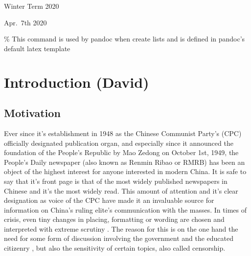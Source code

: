 \documentclass[12pt,a4paper]{article}
\begin{document}
\begin{titlepage}
  \noindent\begin{minipage}[t]{0.5\textwidth}
  \end{minipage}
  \begin{minipage}[t]{0.7\textwidth}
  \hspace{1cm}Winter Term 2020
  \end{minipage}

  \noindent\begin{minipage}[t]{0.5\textwidth}
  \end{minipage}
  \begin{minipage}[t]{0.7\textwidth}
  \hspace{1cm}Apr.~7th 2020
  \end{minipage}

\end{titlepage}

\restoregeometry


{
\hypersetup{linkcolor=black}
\setcounter{tocdepth}{2}
\tableofcontents
}
\newpage
\listoftables
\newpage
\listoffigures
\newpage
{} 
\% This command is used by pandoc when create lists and is defined in pandoc's default latex template
\providecommand{\tightlist}{%
  \setlength{\itemsep}{0pt}\setlength{\parskip}{0pt}}

\hypertarget{introduction-david}{%
\section{Introduction (David)}\label{introduction-david}}

\hypertarget{motivation}{%
\subsection{Motivation}\label{motivation}}

Ever since it's establishment in 1948 as the Chinese Communist Party's (CPC) officially designated publication organ, and especially since it announced the foundation of the People's Republic by Mao Zedong on October 1st, 1949, the People's Daily newspaper (also known as Renmin Ribao or RMRB) has been an object of the highest interest for anyone interested in modern China. It is safe to say that it's front page is that of the most widely published newspapers in Chinese and it's the most widely read. This amount of attention and it's clear designation as voice of the CPC have made it an invaluable source for information on China's ruling elite's communication with the masses. In times of crisis, even tiny changes in placing, formatting or wording are chosen and interpreted with extreme scrutiny \citet{tan1990}. The reason for this is on the one hand the need for some form of discussion involving the government and the educated citizenry \citet{kuhn2002}, but also the sensitivity of certain topics, also called censorship.
\end{document}
